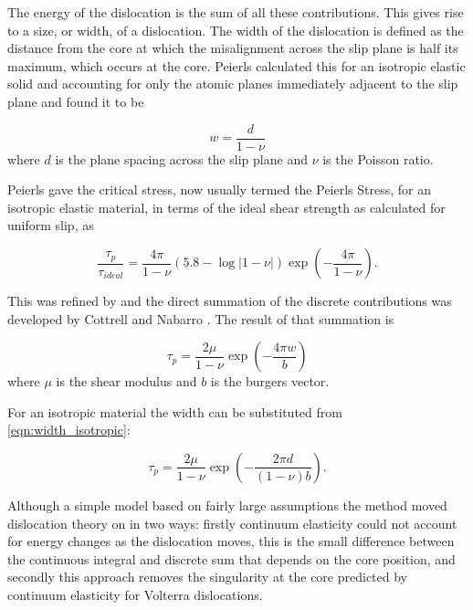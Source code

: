The energy of the dislocation is the sum of all these contributions. This gives rise to a size, or width, of a dislocation. The width of the dislocation is defined as the distance from the core at which the misalignment across the slip plane is half its maximum, which occurs at the core. Peierls calculated this for an isotropic elastic solid and accounting for only the atomic planes immediately adjacent to the slip plane and found it to be 

\begin{equation}
w = \frac{d}{1-\nu}
\label{eqn:width_isotropic}
\end{equation}
where $d$ is the plane spacing across the slip plane and $\nu$ is the Poisson ratio.


Peierls gave the critical stress, now usually termed the Peierls Stress, for an isotropic elastic material, in terms of the ideal shear strength as calculated for uniform slip, as


\begin{equation}
\frac{\tau_p}{\tau_{ideal}} = \frac{4 \pi}{1 - \nu} (5.8 - \log|1-\nu|) \exp\left(-\frac{4\pi}{1 - \nu}\right).
\end{equation}

This was refined by \citet{Nabarro1947} and the direct summation of the discrete contributions was developed by Cottrell and Nabarro \cite{cottrell1953dislocations}. The result of that summation is



\begin{equation}
\tau_p = \frac{2\mu}{1-\nu} \exp\left( - \frac{4\pi w}{b} \right)
\end{equation}
where $\mu$ is the shear modulus and $b$ is the burgers vector.

For an isotropic material the width can be substituted from \autoref{eqn:width_isotropic}:

\begin{equation}
\tau_p = \frac{2\mu}{1-\nu} \exp\left( - \frac{2\pi d}{(1-\nu)b} \right).
\end{equation}

Although a simple model based on fairly large assumptions the method moved dislocation theory on in two ways: firstly continuum elasticity could not account for energy changes as the dislocation moves, this is the small difference between the continuous integral and discrete sum that depends on the core position, and secondly this approach removes the singularity at the core predicted by continuum elasticity for Volterra dislocations.


